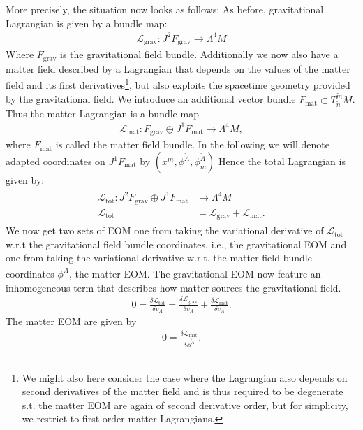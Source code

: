 More precisely, the situation now looks as follows:
As before, gravitational Lagrangian is given by a bundle map:
\begin{align}
    \mathcal{L}_{\text{grav}} : J^2F_{\text{grav}} \longrightarrow \Lambda^4M
\end{align}
Where $F_{\text{grav}}$ is the gravitational field bundle. Additionally we now also have a matter field described by a Lagrangian that depends on the values of the matter field and its first derivatives\footnote{We might also here consider the case where the Lagrangian also depends on second derivatives of the matter field and is thus required to be degenerate s.t. the matter EOM are again of second derivative order, but for simplicity, we restrict to first-order matter Lagrangians.}, but also exploits the spacetime geometry provided by the gravitational field. 
We introduce an additional vector bundle $F_{\text{mat}} \subset T^{\tilde{m}}_{\tilde{n}}M$.
Thus the matter Lagrangian is a bundle map
\begin{align}
    \mathcal{L}_{\text{mat}} : F_{\text{grav}} \oplus J^1F_{\text{mat}} \longrightarrow \Lambda^4M,
\end{align}
where $F_{\text{mat}}$ is called the matter field bundle. In the following we will denote adapted coordinates on $J^1F_{\text{mat}}$ by $(x^m,\phi^{\tilde{A}},\phi^{\tilde{A}}_m)$ Hence the total Lagrangian is given by:
\begin{align}
\begin{aligned}
    \mathcal{L}_{\text{tot}} : J^2F_{\text{grav}} \oplus J^1F_{\text{mat}} &\longrightarrow \Lambda^4M \\
    \mathcal{L}_{\text{tot}} &= \mathcal{L}_{\text{grav}} + \mathcal{L}_{\text{mat}}.
\end{aligned}
\end{align}
We now get two sets of EOM one from taking the variational derivative of $\mathcal{L}_{\text{tot}}$ w.r.t the gravitational field bundle coordinates, i.e., the gravitational EOM and one from taking the variational derivative w.r.t. the matter field bundle coordinates $\phi^{\tilde{A}}$, the matter EOM.
The gravitational EOM now feature an inhomogeneous term that describes how matter sources the gravitational field.
\begin{align}
    0 = \frac{\delta \mathcal{L}_{\text{tot}}}{\delta v_A} = \frac{\delta \mathcal{L}_{\text{grav}}}{\delta v_A} + \frac{\delta \mathcal{L}_{\text{mat}}}{\delta v_A}.
\end{align}
The matter EOM are given by 
\begin{align}
    0 = \frac{\delta \mathcal{L}_{\text{mat}}}{\delta \phi^{\tilde{A}}}.
\end{align}
